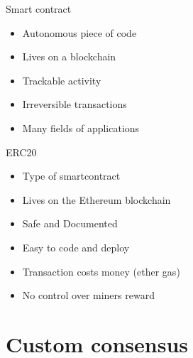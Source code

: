 \documentclass[12pt]{beamer}
\begin{document}
  \begin{frame}{Smart contract}
    \begin{itemize}
      \item \alert{Autonomous} piece of code
      \item Lives on a \alert{blockchain}
      \item \alert{Trackable} activity
      \item \alert{Irreversible} transactions
      \item Many fields of applications
    \end{itemize}
  \end{frame}

  \begin{frame}{ERC20}
    \begin{itemize}
      \item Type of \alert{smartcontract}
      \item Lives on the \alert{Ethereum} blockchain
    \end{itemize}
    \begin{itemize}
      \item Safe and Documented
      \item Easy to code and deploy
    \end{itemize}
    \begin{itemize}
      \item Transaction costs money (ether gas)
      \item No control over miners reward
    \end{itemize}
  \end{frame}



  \section{Custom consensus}
\end{document}
